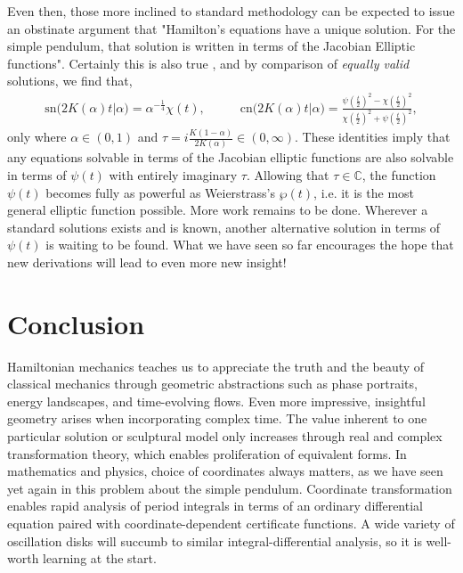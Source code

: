 \documentclass[nofootinbib,preprint]{revtex4-1}
\begin{document}
Even then, those more inclined to standard methodology can be expected to issue an obstinate 
argument that "Hamilton's equations have a unique solution. For the simple pendulum, that 
solution is written in terms of the Jacobian Elliptic functions". Certainly this is also true
\cite{WW1902,WHITTAKER1904}, and by comparison of \textit{equally valid} solutions, we find that,
\begin{eqnarray}
\text{sn}\big(2K(\alpha)t\big|\alpha\big) = \alpha^{-\frac{1}{4}}\chi(t)  , \;\;\;\;\;\;\;\;\;\; 
\text{cn}\big(2K(\alpha)t\big|\alpha\big) = \frac{\psi(\tfrac{t}{2})^2 - \chi(\tfrac{t}{2})^2
}{\chi(\tfrac{t}{2})^2 + \psi(\tfrac{t}{2})^2 },\nonumber
\end{eqnarray}
only where $\alpha \in (0,1)$ and $\tau = i\frac{K(1-\alpha)}{2K(\alpha)} \in (0,\infty)$.
These identities imply that any equations solvable in terms of the Jacobian elliptic functions are also solvable 
in terms of $\psi(t)$ with entirely imaginary $\tau$. Allowing that 
$\tau \in \mathbb{C}$, the function $\psi(t)$ becomes fully as powerful as Weierstrass's 
$\wp(t)$, i.e. it is the most general elliptic function possible. More work remains to 
be done. Wherever a standard solutions exists and is known, another alternative solution 
in terms of $\psi(t)$ is waiting to be found. What we have seen so far encourages the 
hope that new derivations will lead to even more new insight!

\section{Conclusion}

Hamiltonian mechanics teaches us to appreciate the truth and the beauty of classical mechanics 
through geometric abstractions such as phase portraits, energy landscapes, and time-evolving flows. 
Even more impressive, insightful geometry arises when incorporating complex time. The value inherent 
to one particular solution or sculptural model only increases through real and complex transformation 
theory, which enables proliferation of equivalent forms. In mathematics and physics, choice of 
coordinates always matters, as we have seen yet again in this problem about the simple pendulum. 
Coordinate transformation enables rapid analysis of period integrals in terms of an ordinary 
differential equation paired with coordinate-dependent certificate functions. A wide variety of 
oscillation disks will succumb to similar integral-differential analysis, so it is well-worth 
learning at the start. 
\end{document}
